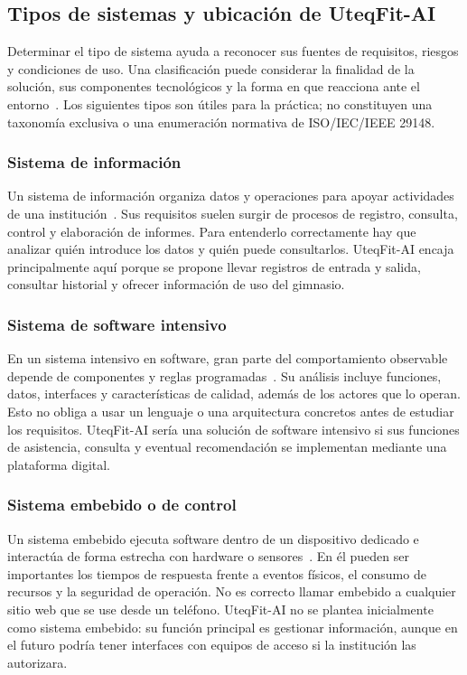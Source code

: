 \subsection{Tipos de sistemas y ubicación de UteqFit-AI}
\label{sec:tipos-sistemas}

Determinar el tipo de sistema ayuda a reconocer sus fuentes de requisitos, riesgos y condiciones de uso. Una clasificación puede considerar la finalidad de la solución, sus componentes tecnológicos y la forma en que reacciona ante el entorno~\cite{pohl2025,swebok2024}. Los siguientes tipos son útiles para la práctica; no constituyen una taxonomía exclusiva o una enumeración normativa de ISO/IEC/IEEE 29148.

\subsubsection{Sistema de información}
Un sistema de información organiza datos y operaciones para apoyar actividades de una institución~\cite{swebok2024}. Sus requisitos suelen surgir de procesos de registro, consulta, control y elaboración de informes. Para entenderlo correctamente hay que analizar quién introduce los datos y quién puede consultarlos. UteqFit-AI encaja principalmente aquí porque se propone llevar registros de entrada y salida, consultar historial y ofrecer información de uso del gimnasio.

\subsubsection{Sistema de software intensivo}
En un sistema intensivo en software, gran parte del comportamiento observable depende de componentes y reglas programadas~\cite{pohl2025}. Su análisis incluye funciones, datos, interfaces y características de calidad, además de los actores que lo operan. Esto no obliga a usar un lenguaje o una arquitectura concretos antes de estudiar los requisitos. UteqFit-AI sería una solución de software intensivo si sus funciones de asistencia, consulta y eventual recomendación se implementan mediante una plataforma digital.

\subsubsection{Sistema embebido o de control}
Un sistema embebido ejecuta software dentro de un dispositivo dedicado e interactúa de forma estrecha con hardware o sensores~\cite{swebok2024}. En él pueden ser importantes los tiempos de respuesta frente a eventos físicos, el consumo de recursos y la seguridad de operación. No es correcto llamar embebido a cualquier sitio web que se use desde un teléfono. UteqFit-AI no se plantea inicialmente como sistema embebido: su función principal es gestionar información, aunque en el futuro podría tener interfaces con equipos de acceso si la institución las autorizara.

